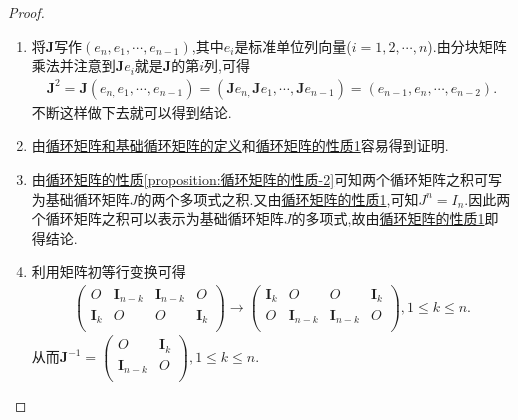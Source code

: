 \documentclass[../../main.tex]{subfiles}%
\begin{document}
\begin{proof}
\begin{enumerate}[(1)]
\item 将$\boldsymbol{J}$写作$(e_n,e_1,\cdots,e_{n-1})$,其中$e_i$是标准单位列向量($i=1,2,\cdots,n$).由分块矩阵乘法并注意到$\boldsymbol{J}e_i$就是$\boldsymbol{J}$的第$i$列,可得
\begin{align*}
\boldsymbol{J}^2=\boldsymbol{J}\left( e_{n,}e_1,\cdots ,e_{n-1} \right) =\left( \boldsymbol{J}e_{n,}\boldsymbol{J}e_1,\cdots ,\boldsymbol{J}e_{n-1} \right) =\left( e_{n-1},e_n,\cdots ,e_{n-2} \right) .
\end{align*}
不断这样做下去就可以得到结论.
\item 由\hyperref[definition:循环矩阵]{循环矩阵和基础循环矩阵的定义}和\hyperref[proposition:循环矩阵的性质]{循环矩阵的性质1}容易得到证明.
\item 由\hyperref[proposition:循环矩阵的性质]{循环矩阵的性质\ref{proposition:循环矩阵的性质-2}}可知两个循环矩阵之积可写为基础循环矩阵$J$的两个多项式之积.又由\hyperref[proposition:循环矩阵的性质]{循环矩阵的性质1},可知$J^n=I_n$.因此两个循环矩阵之积可以表示为基础循环矩阵$J$的多项式,故由\hyperref[proposition:循环矩阵的性质]{循环矩阵的性质1}即得结论.
\item 利用矩阵初等行变换可得
\begin{align*}
\left( \begin{matrix}
O&		\boldsymbol{I}_{n-k}&		\boldsymbol{I}_{n-k}&		O\\
\boldsymbol{I}_k&		O&		O&		\boldsymbol{I}_k\\
\end{matrix} \right) \rightarrow \left( \begin{matrix}
\boldsymbol{I}_k&		O&		O&		\boldsymbol{I}_k\\
O&		\boldsymbol{I}_{n-k}&		\boldsymbol{I}_{n-k}&		O\\
\end{matrix} \right) ,1\leqslant k\leqslant n.
\end{align*}
从而$\boldsymbol{J}^{-1}=\left( \begin{matrix}
O&		\boldsymbol{I}_k\\
\boldsymbol{I}_{n-k}&		O\\
\end{matrix} \right) ,1\leqslant k\leqslant n.$
\end{enumerate}
\end{proof}
\end{document}
